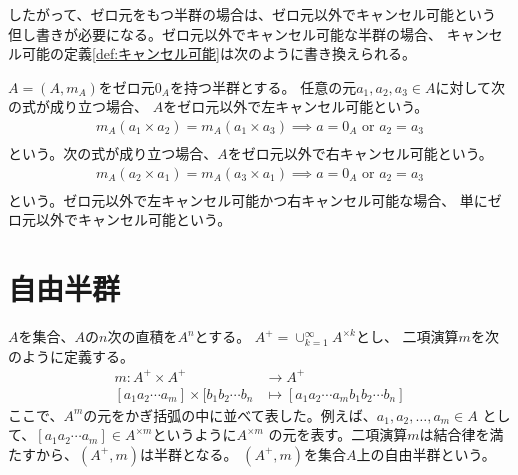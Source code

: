 	したがって、ゼロ元をもつ半群の場合は、ゼロ元以外でキャンセル可能という
	但し書きが必要になる。ゼロ元以外でキャンセル可能な半群の場合、
	キャンセル可能の定義\ref{def:キャンセル可能}は次のように書き換えられる。

	\begin{definition}[ゼロ元以外でキャンセル可能]\label{def:ゼロ元以外でキャンセル可能} %
		$A=(A,m_A)$をゼロ元$0_A$を持つ半群とする。
		任意の元$a_1,a_2,a_3\in A$に対して次の式が成り立つ場合、
		$A$をゼロ元以外で左キャンセル可能という。
		\begin{equation*}\begin{split} %
			m_A(a_1\times a_2) = m_A(a_1\times a_3) \implies a=0_A\text{ or } a_2=a_3 \\
		\end{split}\end{equation*} %
		という。次の式が成り立つ場合、$A$をゼロ元以外で右キャンセル可能という。
		\begin{equation*}\begin{split} %
			m_A(a_2\times a_1) = m_A(a_3\times a_1) \implies a=0_A\text{ or } a_2=a_3 \\
		\end{split}\end{equation*} %
		という。ゼロ元以外で左キャンセル可能かつ右キャンセル可能な場合、
		単にゼロ元以外でキャンセル可能という。
	\end{definition} %

\section{自由半群}\label{s1:自由半群} %
	\begin{definition}[自由半群]\label{def:自由半群} %
		$A$を集合、$A$の$n$次の直積を$A^n$とする。 $A^+=\cup_{k=1}^\infty A^{\times k}$とし、
		二項演算$m$を次のように定義する。
		\begin{equation*}\begin{split}
			m: A^+ \times A^+ &\to A^+ \\
				[a_1 a_2\cdots a_m] \times [b_1 b_2 \cdots b_n
					&\mapsto [a_1 a_2\cdots a_m b_1 b_2 \cdots b_n]
		\end{split}\end{equation*}
		ここで、$A^m$の元をかぎ括弧の中に並べて表した。例えば、$a_1,a_2,\dots,a_m\in A$
		として、$[a_1 a_2\cdots a_m]\in A^{\times m}$というように$A^{\times m}$
		の元を表す。二項演算$m$は結合律を満たすから、$(A^+,m)$は半群となる。
		$(A^+,m)$を集合$A$上の自由半群という。
	\end{definition} %

